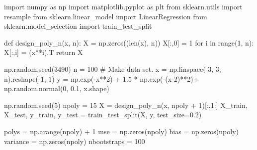 \documentclass[
  letterpaper,
  DIV=11,
  numbers=noendperiod]{scrartcl}
\newenvironment{Shaded}{\begin{snugshade}}{\end{snugshade}}
\newcommand{\BuiltInTok}[1]{\textcolor[rgb]{0.00,0.23,0.31}{#1}}
\newcommand{\CommentTok}[1]{\textcolor[rgb]{0.37,0.37,0.37}{#1}}
\newcommand{\ControlFlowTok}[1]{\textcolor[rgb]{0.00,0.23,0.31}{#1}}
\newcommand{\DecValTok}[1]{\textcolor[rgb]{0.68,0.00,0.00}{#1}}
\newcommand{\FloatTok}[1]{\textcolor[rgb]{0.68,0.00,0.00}{#1}}
\newcommand{\ImportTok}[1]{\textcolor[rgb]{0.00,0.46,0.62}{#1}}
\newcommand{\KeywordTok}[1]{\textcolor[rgb]{0.00,0.23,0.31}{#1}}
\newcommand{\NormalTok}[1]{\textcolor[rgb]{0.00,0.23,0.31}{#1}}
\newcommand{\OperatorTok}[1]{\textcolor[rgb]{0.37,0.37,0.37}{#1}}
\begin{document}
\begin{Shaded}
\begin{Highlighting}[]
\ImportTok{import}\NormalTok{ numpy }\ImportTok{as}\NormalTok{ np}
\ImportTok{import}\NormalTok{ matplotlib.pyplot }\ImportTok{as}\NormalTok{ plt}
\ImportTok{from}\NormalTok{ sklearn.utils }\ImportTok{import}\NormalTok{ resample}
\ImportTok{from}\NormalTok{ sklearn.linear\_model }\ImportTok{import}\NormalTok{ LinearRegression}
\ImportTok{from}\NormalTok{ sklearn.model\_selection }\ImportTok{import}\NormalTok{ train\_test\_split}

\KeywordTok{def}\NormalTok{ design\_poly\_n(x, n):}
\NormalTok{    X }\OperatorTok{=}\NormalTok{ np.zeros((}\BuiltInTok{len}\NormalTok{(x), n))}
\NormalTok{    X[:,}\DecValTok{0}\NormalTok{] }\OperatorTok{=} \DecValTok{1}
    \ControlFlowTok{for}\NormalTok{ i }\KeywordTok{in} \BuiltInTok{range}\NormalTok{(}\DecValTok{1}\NormalTok{, n):}
\NormalTok{        X[:,i] }\OperatorTok{=}\NormalTok{ (x}\OperatorTok{**}\NormalTok{i).T}
    \ControlFlowTok{return}\NormalTok{ X}

\NormalTok{np.random.seed(}\DecValTok{3490}\NormalTok{)}
\NormalTok{n }\OperatorTok{=} \DecValTok{100}
\CommentTok{\# Make data set.}
\NormalTok{x }\OperatorTok{=}\NormalTok{ np.linspace(}\OperatorTok{{-}}\DecValTok{3}\NormalTok{, }\DecValTok{3}\NormalTok{, n).reshape(}\OperatorTok{{-}}\DecValTok{1}\NormalTok{, }\DecValTok{1}\NormalTok{)}
\NormalTok{y }\OperatorTok{=}\NormalTok{ np.exp(}\OperatorTok{{-}}\NormalTok{x}\OperatorTok{**}\DecValTok{2}\NormalTok{) }\OperatorTok{+} \FloatTok{1.5} \OperatorTok{*}\NormalTok{ np.exp(}\OperatorTok{{-}}\NormalTok{(x}\OperatorTok{{-}}\DecValTok{2}\NormalTok{)}\OperatorTok{**}\DecValTok{2}\NormalTok{)}\OperatorTok{+}\NormalTok{ np.random.normal(}\DecValTok{0}\NormalTok{, }\FloatTok{0.1}\NormalTok{, x.shape)}

\NormalTok{np.random.seed(}\DecValTok{5}\NormalTok{)}
\NormalTok{npoly }\OperatorTok{=} \DecValTok{15}
\NormalTok{X }\OperatorTok{=}\NormalTok{ design\_poly\_n(x, npoly }\OperatorTok{+} \DecValTok{1}\NormalTok{)[:,}\DecValTok{1}\NormalTok{:]}
\NormalTok{X\_train, X\_test, y\_train, y\_test }\OperatorTok{=}\NormalTok{ train\_test\_split(X, y, test\_size}\OperatorTok{=}\FloatTok{0.2}\NormalTok{)}

\NormalTok{polys }\OperatorTok{=}\NormalTok{ np.arange(npoly) }\OperatorTok{+} \DecValTok{1}
\NormalTok{mse }\OperatorTok{=}\NormalTok{ np.zeros(npoly)}
\NormalTok{bias }\OperatorTok{=}\NormalTok{ np.zeros(npoly)}
\NormalTok{variance }\OperatorTok{=}\NormalTok{ np.zeros(npoly)}
\NormalTok{nbootstraps }\OperatorTok{=} \DecValTok{100}


\end{Highlighting}
\end{Shaded}
\end{document}
